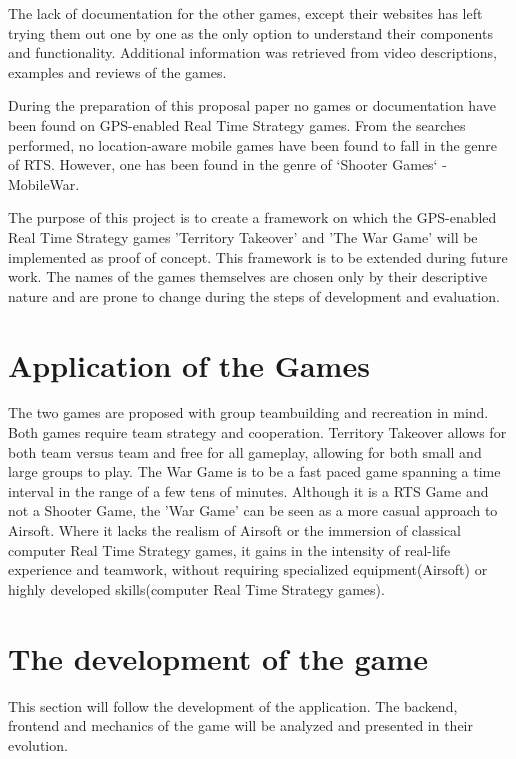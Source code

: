 \documentclass{article}
\begin{document}
The lack of documentation for the other games, except their websites has left
trying them out one by one as the only option to understand their components and
functionality. Additional information was retrieved from video descriptions,
examples and reviews of the games.\newline

During the preparation of this proposal paper no games or documentation have
been found on GPS-enabled Real Time Strategy games. From the searches performed,
no location-aware mobile games have been found to fall in the genre of RTS.
However, one has been found in the genre of `Shooter Games` - MobileWar.\newline

The purpose of this project is to create a framework on which the GPS-enabled
Real Time Strategy games 'Territory Takeover' and 'The War Game' will be
implemented as proof of concept. This framework is to be extended during future
work. The names of the games themselves are chosen only by their descriptive
nature and are prone to change during the steps of development and evaluation.

\section{Application of the Games}
The two games are proposed with group teambuilding and recreation in mind. Both
games require team strategy and cooperation. Territory Takeover allows for both
team versus team and free for all gameplay, allowing for both small and large
groups to play. The War Game is to be a fast paced game spanning a time interval
in the range of a few tens of minutes. Although it is a RTS Game and not a
Shooter Game, the 'War Game' can be seen as a more casual approach to Airsoft.
Where it lacks the realism of Airsoft or the immersion of classical computer
Real Time Strategy games, it gains in the intensity of real-life experience and
teamwork, without requiring specialized equipment(Airsoft) or highly developed
skills(computer Real Time Strategy games).


\section{The development of the game}

This section will follow the development of the application. The backend,
frontend and mechanics of the game will be analyzed and presented in their
evolution. \newline
\end{document}
